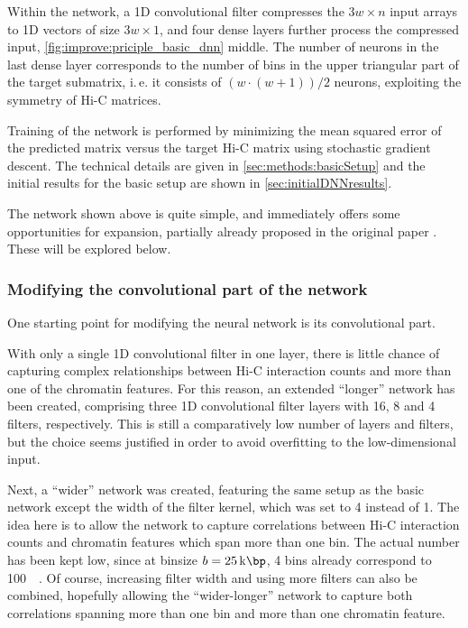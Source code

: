 Within the network, a 1D convolutional filter compresses the $3w \times n$ input arrays to 1D vectors
of size $3w \times 1$, and four dense layers further process the compressed input, \cref{fig:improve:priciple_basic_dnn} middle.
The number of neurons in the last dense layer corresponds to the number of bins
in the upper triangular part of the target submatrix, i.\,e. it consists of $(w \cdot (w+1))/2$ neurons,
exploiting the symmetry of Hi-C matrices.

Training of the network is performed by minimizing the mean squared error of the predicted matrix
versus the target Hi-C matrix using stochastic gradient descent.
The technical details are given in \cref{sec:methods:basicSetup}
and the initial results for the basic setup are shown in \cref{sec:initialDNNresults}.

The network shown above is quite simple, and immediately offers some opportunities
for expansion, partially already proposed in the original paper \cite{Farre2018a}.
These will be explored below.

\subsubsection{Modifying the convolutional part of the network}
One starting point for modifying the neural network is its convolutional part.

With only a single 1D convolutional filter in one layer, there is little chance of capturing complex relationships 
between Hi-C interaction counts and more than one of the chromatin features.
For this reason, an extended ``longer'' network has been created, 
comprising three 1D convolutional filter layers with 16, 8 and 4 filters, respectively.
This is still a comparatively low number of layers and filters,
but the choice seems justified in order to avoid overfitting to the low-dimensional input.

Next, a ``wider'' network was created, featuring the same setup as the basic network
except the width of the filter kernel, which was set to 4 instead of 1.
The idea here is to allow the network to capture correlations between Hi-C interaction counts
and chromatin features which span more than one bin. 
The actual number has been kept low, since at binsize $b=\SI{25}{\kilo\bp}$, 4 bins already correspond to \SI{100}{\kilo\bp}.
Of course, increasing filter width and using more filters can also be combined,
hopefully allowing the  ``wider-longer'' network to capture both correlations
spanning more than one bin and more than one chromatin feature.

